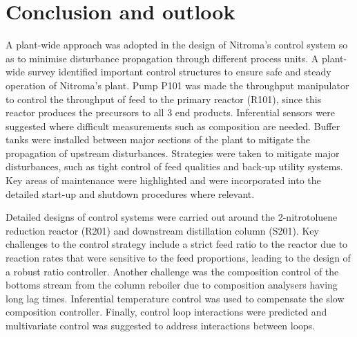 \section{Conclusion and outlook}
A plant-wide approach was adopted in the design of Nitroma's control system so as to minimise disturbance propagation through different process units. A plant-wide survey identified important control structures to ensure safe and steady operation of Nitroma's plant. Pump P101 was made the throughput manipulator to control the throughput of feed to the primary reactor (R101), since this reactor produces the precursors to all 3 end products. Inferential sensors were suggested where difficult measurements such as composition are needed. Buffer tanks were installed between major sections of the plant to mitigate the propagation of upstream disturbances. Strategies were taken to mitigate major disturbances, such as tight control of feed qualities and back-up utility systems. Key areas of maintenance were highlighted and were incorporated into the detailed start-up and shutdown procedures where relevant.

Detailed designs of control systems were carried out around the 2-nitrotoluene reduction reactor (R201) and downstream distillation column (S201). Key challenges to the control strategy include a strict feed ratio to the reactor due to reaction rates that were sensitive to the feed proportions, leading to the design of a robust ratio controller. Another challenge was the composition control of the bottoms stream from the column reboiler due to composition analysers having long lag times. Inferential temperature control was used to compensate the slow composition controller. Finally, control loop interactions were predicted and multivariate control was suggested to address interactions between loops.  

